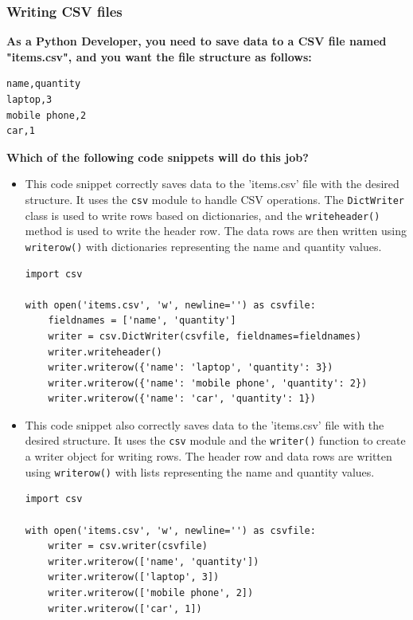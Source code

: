 \subsubsection{Writing CSV files}
\textbf{As a Python Developer, you need to save data to a CSV file named "items.csv", and you want the file structure as follows:}

\begin{verbatim}
name,quantity
laptop,3
mobile phone,2
car,1
\end{verbatim}

\textbf{Which of the following code snippets will do this job? }

\begin{itemize}
\item This code snippet correctly saves data to the 'items.csv' file with the desired structure. It uses the \texttt{csv} module to handle CSV operations. The \texttt{DictWriter} class is used to write rows based on dictionaries, and the \texttt{writeheader()} method is used to write the header row. The data rows are then written using \texttt{writerow()} with dictionaries representing the name and quantity values.
\begin{codebox}
\begin{verbatim}
import csv
 
with open('items.csv', 'w', newline='') as csvfile:
    fieldnames = ['name', 'quantity']
    writer = csv.DictWriter(csvfile, fieldnames=fieldnames)
    writer.writeheader()
    writer.writerow({'name': 'laptop', 'quantity': 3})
    writer.writerow({'name': 'mobile phone', 'quantity': 2})
    writer.writerow({'name': 'car', 'quantity': 1})
\end{verbatim}
\end{codebox}
\item This code snippet also correctly saves data to the 'items.csv' file with the desired structure. It uses the \texttt{csv} module and the \texttt{writer()} function to create a writer object for writing rows. The header row and data rows are written using \texttt{writerow()} with lists representing the name and quantity values.
\begin{codebox}
\begin{verbatim}
import csv
 
with open('items.csv', 'w', newline='') as csvfile:
    writer = csv.writer(csvfile)
    writer.writerow(['name', 'quantity'])
    writer.writerow(['laptop', 3])
    writer.writerow(['mobile phone', 2])
    writer.writerow(['car', 1])
\end{verbatim}
\end{codebox}
\end{itemize}


